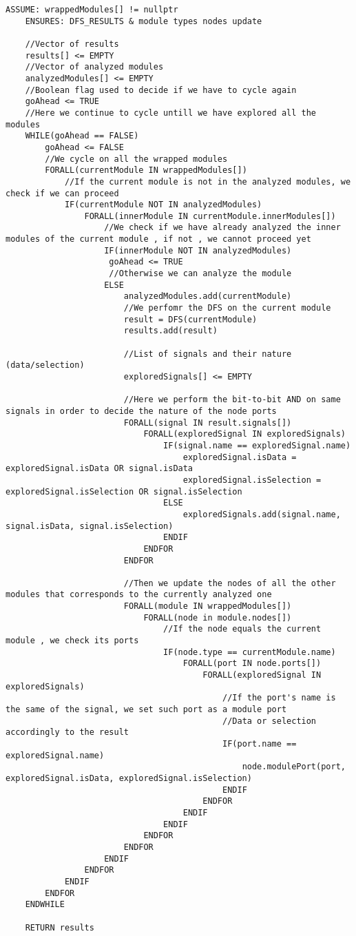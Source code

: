 \documentclass{article}
\newcommand{\sectionbreak}{\clearpage}
\begin{document}
\begin{mdframed}[hidealllines=true, backgroundcolor=gray!10]
	\begin{lstlisting}[basicstyle=\tiny]
	ASSUME: wrappedModules[] != nullptr
	ENSURES: DFS_RESULTS & module types nodes update
	
	//Vector of results
	results[] <= EMPTY
	//Vector of analyzed modules
	analyzedModules[] <= EMPTY
	//Boolean flag used to decide if we have to cycle again
	goAhead <= TRUE
	//Here we continue to cycle untill we have explored all the modules
	WHILE(goAhead == FALSE)
		goAhead <= FALSE
		//We cycle on all the wrapped modules
		FORALL(currentModule IN wrappedModules[])
			//If the current module is not in the analyzed modules, we check if we can proceed
			IF(currentModule NOT IN analyzedModules)
				FORALL(innerModule IN currentModule.innerModules[])
					//We check if we have already analyzed the inner modules of the current module , if not , we cannot proceed yet
					IF(innerModule NOT IN analyzedModules)
					 goAhead <= TRUE
					 //Otherwise we can analyze the module
					ELSE
						analyzedModules.add(currentModule)
						//We perfomr the DFS on the current module
						result = DFS(currentModule)
						results.add(result)
						
						//List of signals and their nature (data/selection)
						exploredSignals[] <= EMPTY
						
						//Here we perform the bit-to-bit AND on same signals in order to decide the nature of the node ports
						FORALL(signal IN result.signals[])
							FORALL(exploredSignal IN exploredSignals)
								IF(signal.name == exploredSignal.name)
									exploredSignal.isData = exploredSignal.isData OR signal.isData
									exploredSignal.isSelection = exploredSignal.isSelection OR signal.isSelection
								ELSE
									exploredSignals.add(signal.name, signal.isData, signal.isSelection)
								ENDIF
							ENDFOR
						ENDFOR
						
						//Then we update the nodes of all the other modules that corresponds to the currently analyzed one
						FORALL(module IN wrappedModules[])
							FORALL(node in module.nodes[])
								//If the node equals the current module , we check its ports
								IF(node.type == currentModule.name)
									FORALL(port IN node.ports[])
										FORALL(exploredSignal IN exploredSignals)
											//If the port's name is the same of the signal, we set such port as a module port
											//Data or selection accordingly to the result
											IF(port.name == exploredSignal.name)
												node.modulePort(port, exploredSignal.isData, exploredSignal.isSelection)
											ENDIF
										ENDFOR
									ENDIF
								ENDIF
							ENDFOR
						ENDFOR
					ENDIF
				ENDFOR
			ENDIF
		ENDFOR
	ENDWHILE
	
	RETURN results
	\end{lstlisting}
\end{mdframed}

\sectionbreak{\clearpage}
\end{document}
